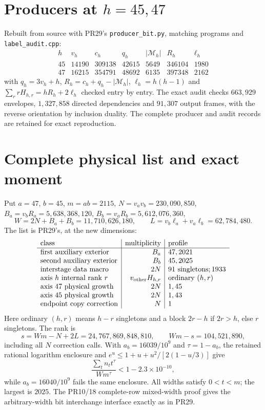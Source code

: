 \documentclass[11pt]{article}
\begin{document}
\section{Producers at $h=45,47$}\label{sec:producers}
Rebuilt from source with PR29's \texttt{producer\_bit.py}, matching programs
and \texttt{label\_audit.cpp}:
\[
\begin{array}{c|rrrrrr}
h&v_h&c_h&q_h&|\mathcal M_h|&R_h&\ell_h\\\hline
45&14190&309138&42615&5649&346104&1980\\
47&16215&354791&48692&6135&397348&2162
\end{array}
\]
with $q_h=3v_h+h$, $R_h=c_h+q_h-|\mathcal M_h|$, $\ell_h=h(h-1)$ and
$\sum_r rH_{h,r}=hR_h+2\ell_h$ checked entry by entry. The exact audit
checks $663{,}929$ envelopes, $1{,}327{,}858$ directed dependencies and
$91{,}307$ output frames, with the reverse orientation by inclusion duality.
The complete producer and audit records are retained for exact reproduction.

\section{Complete physical list and exact moment}
Put $a=47$, $b=45$, $m=ab=2115$, $N=v_av_b=230{,}090{,}850$,
$B_a=v_bR_a=5{,}638{,}368{,}120$, $B_b=v_aR_b=5{,}612{,}076{,}360$,
\[
 W=2N+B_a+B_b=11{,}710{,}626{,}180,\qquad
 L=v_b\ell_a+v_a\ell_b=62{,}784{,}480.
\]
The list is PR29's, at the new dimensions:
\[
\begin{array}{l|r|l}
\text{class}&\text{multiplicity}&\text{profile}\\\hline
\text{first auxiliary exterior}&B_a&47,2021\\
\text{second auxiliary exterior}&B_b&45,2025\\
\text{interstage data macro}&2N&91\text{ singletons};1933\\
\text{axis }h\text{ internal rank }r&v_{\rm other}H_{h,r}&\text{ordinary }(h,r)\\
\text{axis }47\text{ physical growth}&2N&1,45\\
\text{axis }45\text{ physical growth}&2N&1,43\\
\text{endpoint copy correction}&N&1
\end{array}
\]
Here ordinary $(h,r)$ means $h-r$ singletons and a block $2r-h$ if
$2r>h$, else $r$ singletons. The rank is
\[
 s=Wm-N+2L=24{,}767{,}869{,}848{,}810,\qquad Wm-s=104{,}521{,}890,
\]
including all $N$ correction calls. With $a_b=16039/10^9$ and $\tau=1-a_b$,
the retained rational logarithm enclosure and
$e^u\le1+u+u^2/[2(1-u/3)]$ give
\[
 \frac{\sum_t n_t t^\tau}{Wm^\tau}<1-2.3\times10^{-10},
\]
while $a_b=16040/10^9$ fails the same enclosure. All widths satisfy
$0<t<m$; the largest is $2025$. The PR10/18 complete-row mixed-width proof
gives the arbitrary-width bit interchange interface exactly as in PR29.
\end{document}

